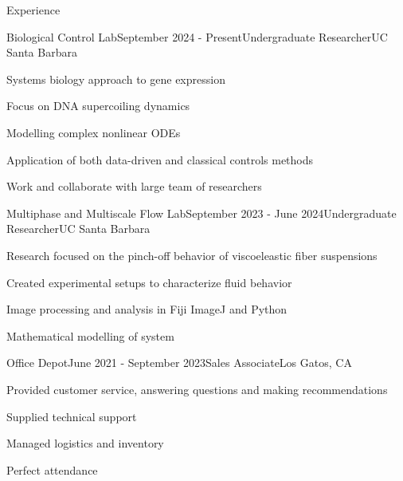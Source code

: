 \documentclass[
	11pt, %
]{resume} %
\begin{document}
\begin{rSection}{Experience}

	\begin{rSubsection}{Biological Control Lab}{September 2024 - Present}{Undergraduate Researcher}{UC Santa Barbara}
		\item Systems biology approach to gene expression
		\item Focus on DNA supercoiling dynamics
		\item Modelling complex nonlinear ODEs
		\item Application of both data-driven and classical controls methods
		\item Work and collaborate with large team of researchers
	\end{rSubsection}


	\begin{rSubsection}{Multiphase and Multiscale Flow Lab}{September 2023 - June 2024}{Undergraduate Researcher}{UC Santa Barbara}
		\item Research focused on the pinch-off behavior of viscoeleastic fiber suspensions
		\item Created experimental setups to characterize fluid behavior
		\item Image processing and analysis in Fiji ImageJ and Python
		\item Mathematical modelling of system
	\end{rSubsection}


	\begin{rSubsection}{Office Depot}{June 2021 - September 2023}{Sales Associate}{Los Gatos, CA}
		\item Provided customer service, answering questions and making recommendations
		\item Supplied technical support 
		\item Managed logistics and inventory
		\item Perfect attendance
	\end{rSubsection}

\end{rSection}

\end{document}
